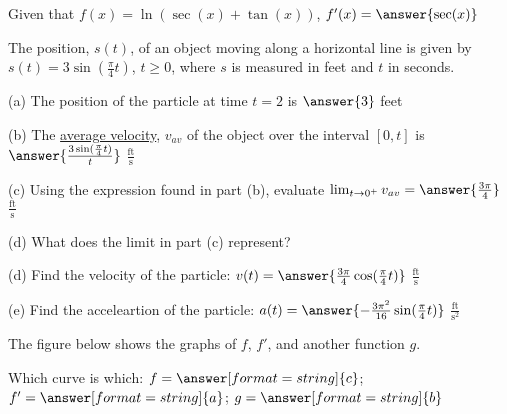 \documentclass{ximera}
\begin{document}
\begin{exercise}
Given that $f(x)=\ln(\sec(x)+\tan(x))$, $f'(x) = \answer{\sec(x)}$
\end{exercise}


\begin{exercise}
The position, $s(t)$, of an object moving along a horizontal line is given by $s(t)=3\sin\left(\frac{\pi}{4}t\right)$, $t\geq0$, where $s$ is measured in feet and $t$ in seconds.

(a) The position of the particle at time $t=2$ is $\answer{3}$ feet

(b) The \underline{average velocity}, $v_{av}$ of the object over the interval $[0,t]$ is $\answer{\frac{3\sin(\frac{\pi}{4}t)}{t}}$ $\frac{\text{ft}}{\text{s}}$

(c) Using the expression found in part (b), evaluate $\lim_{t\to0^+} v_{av} = \answer{\frac{3\pi}{4}}$ $\frac{\text{ft}}{\text{s}}$

(d) What does the limit in part (c) represent?
\begin{multipleChoice}
\end{multipleChoice}

(d) Find the velocity of the particle: $v(t)=\answer{\frac{3\pi}{4}\cos(\frac{\pi}{4}t)}$ $\frac{\text{ft}}{\text{s}}$

(e) Find the acceleartion of the particle: $a(t)=\answer{-\frac{3\pi^2}{16}\sin(\frac{\pi}{4}t)}$ $\frac{\text{ft}}{\text{s}^2}$

\end{exercise}

\begin{exercise}
The figure below shows the graphs of $f$, $f'$, and another function $g$.
\begin{image}
\end{image}

Which curve is which: $f=\answer[format=string]{c}$; $f'=\answer[format=string]{a}$; $g=\answer[format=string]{b}$
\end{exercise}
\end{document}
